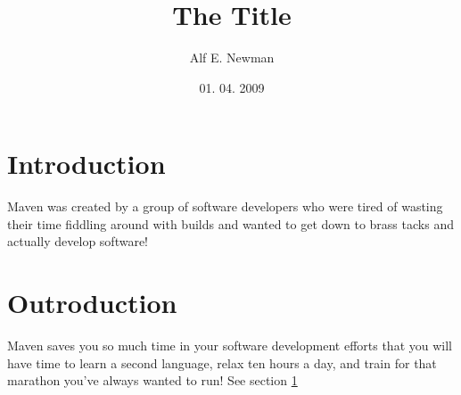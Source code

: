 \documentclass[11pt]{article}
\begin{document}
\title{The Title}
\author{Alf E. Newman}
\date{01. 04. 2009}
\maketitle

\section{Introduction}
\label{sec_Introduction}
Maven was created by a group of software developers who were tired of wasting their time fiddling around with builds and wanted to get down to brass tacks and actually develop software!

\section{Outroduction}
Maven saves you so much time in your software development efforts that you will have time to learn a second language, relax ten hours a day, and train for that marathon you've always wanted to run! See section \ref{sec_Introduction}
  
\end{document}
